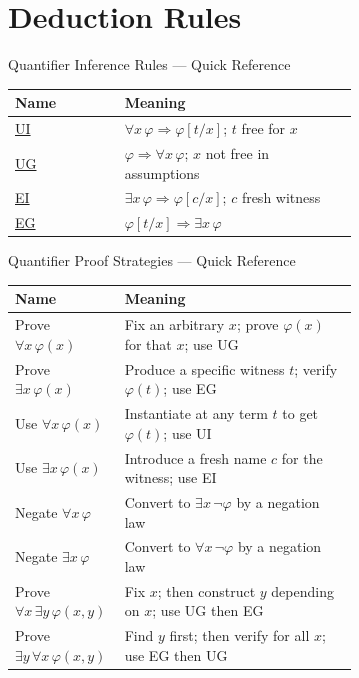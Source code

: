 \section{Deduction Rules}


\begin{toolkitbox}{Quantifier Inference Rules --- Quick Reference}
\small
\begin{tabular}{l p{0.68\linewidth}}
\toprule
\textbf{Name}  & \textbf{Meaning} \\
\midrule
\hyperref[def:ui]{UI}   & $\forall x\,\varphi \Rightarrow \varphi[t/x]$; $t$ free for $x$ \\
\hyperref[def:ug]{UG}   & $\varphi \Rightarrow \forall x\,\varphi$; $x$ not free in assumptions \\
\hyperref[def:ei]{EI}   & $\exists x\,\varphi \Rightarrow \varphi[c/x]$; $c$ fresh witness \\
\hyperref[def:eg]{EG}   & $\varphi[t/x] \Rightarrow \exists x\,\varphi$ \\
\bottomrule
\end{tabular}
\end{toolkitbox}



\begin{toolkitbox}{Quantifier Proof Strategies --- Quick Reference}
\small
\begin{tabular}{l p{0.68\linewidth}}
\toprule
\textbf{Name} & \textbf{Meaning} \\
\midrule
Prove $\forall x\,\varphi(x)$  & Fix an arbitrary $x$; prove $\varphi(x)$ for that $x$; use UG \\
Prove $\exists x\,\varphi(x)$  & Produce a specific witness $t$; verify $\varphi(t)$; use EG \\
Use $\forall x\,\varphi(x)$    & Instantiate at any term $t$ to get $\varphi(t)$; use UI \\
Use $\exists x\,\varphi(x)$    & Introduce a fresh name $c$ for the witness; use EI \\
Negate $\forall x\,\varphi$    & Convert to $\exists x\,\neg\varphi$ by a negation law \\
Negate $\exists x\,\varphi$    & Convert to $\forall x\,\neg\varphi$ by a negation law \\
\midrule
Prove $\forall x\,\exists y\,\varphi(x,y)$ & Fix $x$; then construct $y$ depending on $x$; use UG then EG \\
Prove $\exists y\,\forall x\,\varphi(x,y)$ & Find $y$ first; then verify for all $x$; use EG then UG \\
\bottomrule
\end{tabular}
\end{toolkitbox}

